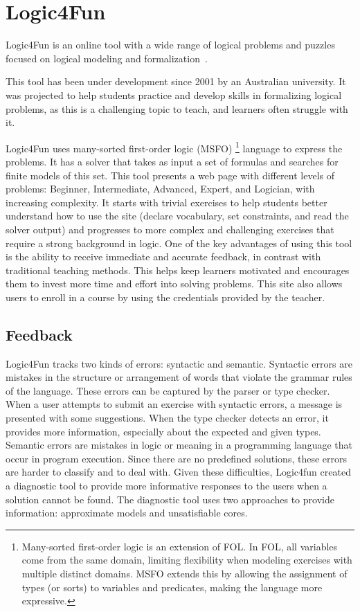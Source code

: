 \section{Logic4Fun}

Logic4Fun is an online tool with a wide range of logical problems and puzzles focused on logical modeling and formalization~\cite{slaney_logic}.

This tool has been under development since 2001 by an Australian university. It was projected to help students practice and develop skills in formalizing logical problems, as this is a challenging topic to teach, and learners often struggle with it.

Logic4Fun uses many-sorted first-order logic (MSFO) \footnote{Many-sorted first-order logic is an extension of \gls{FOL}. In \gls{FOL}, all variables come from the same domain, limiting flexibility when modeling exercises with multiple distinct domains. MSFO extends this by allowing the assignment of types (or sorts) to variables and predicates, making the language more expressive.} language to express the problems. It has a solver that takes as input a set of formulas and searches for finite models of this set. This tool presents a web page with different levels of problems: Beginner, Intermediate, Advanced, Expert, and Logician, with increasing complexity. It starts with trivial exercises to help students better understand how to use the site (declare vocabulary, set constraints, and read the solver output) and progresses to more complex and challenging exercises that require a strong background in logic. One of the key advantages of using this tool is the ability to receive immediate and accurate feedback, in contrast with traditional teaching methods. This helps keep learners motivated and encourages them to invest more time and effort into solving problems. This site also allows users to enroll in a course by using the credentials provided by the teacher.

\subsection{Feedback}

Logic4Fun tracks two kinds of errors: syntactic and semantic. Syntactic errors are mistakes in the structure or arrangement of words that violate the grammar rules of the language. These errors can be captured by the parser or type checker. When a user attempts to submit an exercise with syntactic errors, a message is presented with some suggestions. When the type checker detects an error, it provides more information, especially about the expected and given types. Semantic errors are mistakes in logic or meaning in a programming language that occur in program execution. Since there are no predefined solutions, these errors are harder to classify and to deal with. Given these difficulties, Logic4fun created a diagnostic tool to provide more informative responses to the users when a solution cannot be found. The diagnostic tool uses two approaches to provide information: approximate models and unsatisfiable cores.

